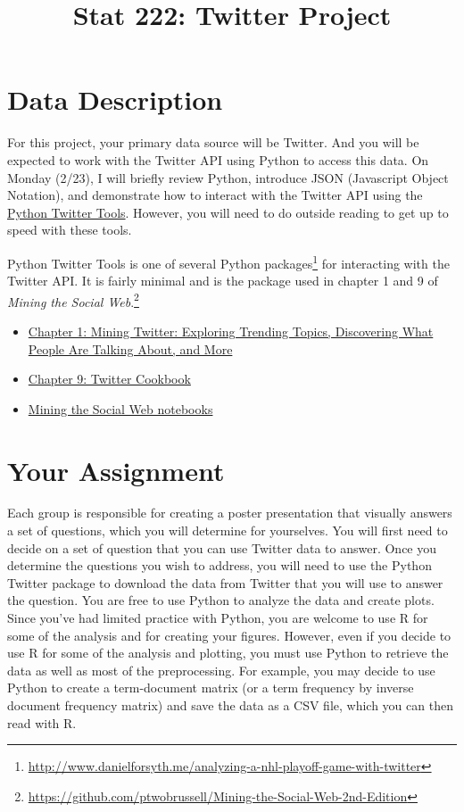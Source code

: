 \documentclass[11pt, oneside]{article}   	%
\title{Stat 222: Twitter Project}
\date{}							%
\begin{document}
\maketitle

\section{Data Description}

For this project, your primary data source will be Twitter.  And you will be
expected to work with the Twitter API using Python to access this data. On
Monday (2/23), I will briefly review Python, introduce JSON (Javascript Object
Notation), and demonstrate how to interact with the Twitter API using the
\href{https://github.com/sixohsix/twitter}{Python Twitter Tools}.  However, you
will need to do outside reading to get up to speed with these tools. 

Python Twitter Tools is one of several Python
packages\footnote{\url{http://www.danielforsyth.me/analyzing-a-nhl-playoff-game-with-twitter}}
for interacting with the Twitter API.  It is fairly minimal and is the package
used in chapter 1 and 9 of \emph{Mining the Social
Web}.\footnote{\url{https://github.com/ptwobrussell/Mining-the-Social-Web-2nd-Edition}}
\begin{itemize}
\item \href{https://rawgit.com/ptwobrussell/Mining-the-Social-Web-2nd-Edition/master/ipynb/html/Chapter%201%20-%20Mining%20Twitter.html}{Chapter 1: Mining Twitter: Exploring Trending Topics, Discovering What People Are Talking About, and More}
\item \href{https://rawgit.com/ptwobrussell/Mining-the-Social-Web-2nd-Edition/master/ipynb/html/Chapter%209%20-%20Twitter%20Cookbook.html}{Chapter 9: Twitter Cookbook}
\item \href{http://nbviewer.ipython.org/github/ptwobrussell/Mining-the-Social-Web-2nd-Edition/tree/master/ipynb/}{Mining the Social Web notebooks}
\end{itemize}


\section{Your Assignment}

Each group is responsible for creating a poster presentation that visually
answers a set of questions, which you will determine for yourselves.  You will
first need to decide on a set of question that you can use Twitter data to
answer.  Once you determine the questions you wish to address, you will need to
use the Python Twitter package to download the data from Twitter that you will
use to answer the question.  You are free to use Python to analyze the data and
create plots.  Since you've had limited practice with Python, you are welcome
to use R for some of the analysis and for creating your figures. However, even
if you decide to use R for some of the analysis and plotting, you must use
Python to retrieve the data as well as most of the preprocessing.  For example,
you may decide to use Python to create a term-document matrix (or a term
frequency by inverse document frequency matrix) and save the data as a CSV
file, which you can then read with R.
\end{document}
